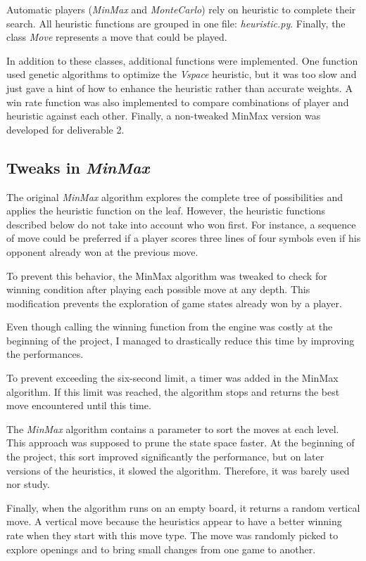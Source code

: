 \documentclass[runningheads]{llncs}
\begin{document}
Automatic players (\textit{MinMax} and
\textit{MonteCarlo}) rely on heuristic to complete
their search. All heuristic functions are grouped
in one file: \textit{heuristic.py}.
Finally, the class \textit{Move} represents a move
that could be played.

In addition to these classes, additional functions
were implemented. One function used genetic
algorithms to optimize the \textit{Vspace}
heuristic, but it was too slow and just gave a hint
of how to enhance the heuristic rather than
accurate weights.  A win rate function was also
implemented to compare combinations of player and
heuristic against each other. Finally, a
non-tweaked MinMax version was developed for
deliverable 2.

\subsection{Tweaks in \textit{MinMax}}
The original \textit{MinMax} algorithm explores the
complete tree of possibilities and applies the
heuristic function on the leaf. However, the
heuristic functions described below do not take
into account who won first. For instance, a sequence of
move could be preferred if a player scores three
lines of four symbols even if his opponent already won at
the previous move.

To prevent this behavior, the MinMax algorithm was
tweaked to check for winning condition after
playing each possible move at any depth. This
modification prevents the exploration of game
states already won by a player.

Even though calling the winning function from the
engine was costly at the beginning of the project,
I managed to drastically reduce this time by
improving the performances.

To prevent exceeding the six-second limit, a timer
was added in the MinMax algorithm. If this limit
was reached, the algorithm stops and returns the
best move encountered until this time.

The \textit{MinMax} algorithm contains a parameter
to sort the moves at each level. This approach was
supposed to prune the state space faster. At the
beginning of the project, this sort improved
significantly the performance, but on later
versions of the heuristics, it slowed the algorithm.
Therefore, it was barely used nor study.

Finally, when the algorithm runs on an empty
board, it returns a random vertical move. A
vertical move because the heuristics appear to
have a better winning rate when they start with
this move type. The move was randomly picked to
explore openings and to bring small changes from one game to another.
\end{document}
